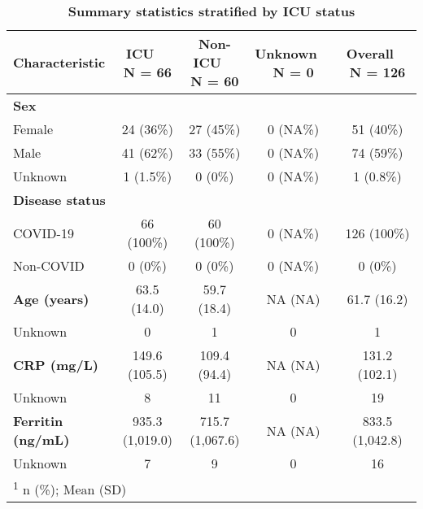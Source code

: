 \begin{table}[H]
\centering
\caption{\label{tab:step3_tbl}\textbf{Summary statistics stratified by ICU status}}
\centering
\begin{tabular}[t]{lcccc}
\toprule
\textbf{Characteristic} & \makecell[c]{\textbf{ICU}\ \ \\N = 66} & \makecell[c]{\textbf{Non-ICU}\ \ \\N = 60} & \makecell[c]{\textbf{Unknown}\ \ \\N = 0} & \makecell[c]{\textbf{Overall}\ \ \\N = 126}\\
\midrule
\textbf{Sex} &  &  &  & \\
\hspace{1em}Female & 24 (36\%) & 27 (45\%) & 0 (NA\%) & 51 (40\%)\\
\hspace{1em}Male & 41 (62\%) & 33 (55\%) & 0 (NA\%) & 74 (59\%)\\
\hspace{1em}Unknown & 1 (1.5\%) & 0 (0\%) & 0 (NA\%) & 1 (0.8\%)\\
\textbf{Disease status} &  &  &  & \\
\addlinespace
\hspace{1em}COVID-19 & 66 (100\%) & 60 (100\%) & 0 (NA\%) & 126 (100\%)\\
\hspace{1em}Non-COVID & 0 (0\%) & 0 (0\%) & 0 (NA\%) & 0 (0\%)\\
\textbf{Age (years)} & 63.5 (14.0) & 59.7 (18.4) & NA (NA) & 61.7 (16.2)\\
\hspace{1em}Unknown & 0 & 1 & 0 & 1\\
\textbf{CRP (mg/L)} & 149.6 (105.5) & 109.4 (94.4) & NA (NA) & 131.2 (102.1)\\
\addlinespace
\hspace{1em}Unknown & 8 & 11 & 0 & 19\\
\textbf{Ferritin (ng/mL)} & 935.3 (1,019.0) & 715.7 (1,067.6) & NA (NA) & 833.5 (1,042.8)\\
\hspace{1em}Unknown & 7 & 9 & 0 & 16\\
\bottomrule
\multicolumn{5}{l}{\rule{0pt}{1em}\textsuperscript{1} n (\%); Mean (SD)}\\
\end{tabular}
\end{table}
